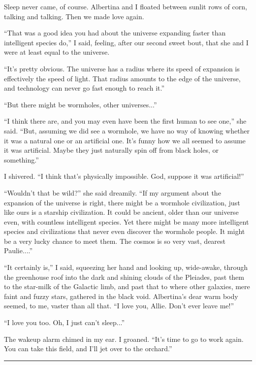 \documentclass[english,11pt,letterpaper,onecolumn]{scrbook}
\begin{document}
	Sleep never came, of course.  Albertina and I floated between sunlit rows of corn, talking and talking.  Then we made love again.

	``That was a good idea you had about the universe expanding faster than intelligent species do,'' I said, feeling, after our second sweet bout, that she and I were at least equal to the universe.

	``It's pretty obvious.  The universe has a radius where its speed of expansion is effectively the speed of light.  That radius amounts to the edge of the universe, and technology can never go fast enough to reach it.''

	``But there might be wormholes, other universes...''

	``I think there are, and you may even have been the first human to see one,'' she said.  ``But, assuming we did see a wormhole, we have no way of knowing whether it was a natural one or an artificial one.  It's funny how we all seemed to assume it was artificial.  Maybe they just naturally spin off from black holes, or something.''

	I shivered.  ``I think that's physically impossible.  God, suppose it was artificial!''

	``Wouldn't that be wild?'' she said dreamily.  ``If my argument about the expansion of the universe is right, there might be a wormhole civilization, just like ours is a starship civilization.  It could be ancient, older than our universe even, with countless intelligent species.  Yet there might be many more intelligent species and civilizations that never even discover the wormhole people.  It might be a very lucky chance to meet them.  The cosmos is so very vast, dearest Paulie....''

	``It certainly is,'' I said, squeezing her hand and looking up, wide-awake, through the greenhouse roof into the dark and shining clouds of the Pleiades, past them to the star-milk of the Galactic limb, and past that to where other galaxies, mere faint and fuzzy stars, gathered in the black void.  Albertina's dear warm body seemed, to me, vaster than all that.  ``I love you, Allie.  Don't ever leave me!''

	``I love you too.  Oh, I just can't sleep...''

	The wakeup alarm chimed in my ear.  I groaned.  ``It's time to go to work again.  You can take this field, and I'll jet over to the orchard.''

\begin{center}\rule[3pt]{2in}{0.5pt}\end{center}
\end{document}
